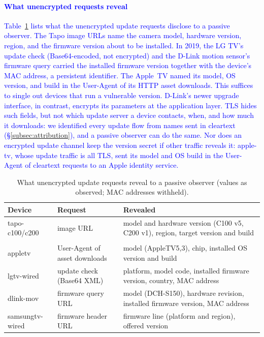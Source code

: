 \paragraph{\textcolor{blue}{What unencrypted requests reveal}}
\textcolor{blue}{Table~\ref{tab:exposure} lists what the unencrypted update requests disclose to a passive observer.
The Tapo image URLs name the camera model, hardware version, region, and the firmware version about to be installed.
In 2019, the LG TV's update check (Base64-encoded, not encrypted) and the D-Link motion sensor's firmware query carried the installed firmware version together with the device's MAC address, a persistent identifier. The Apple~TV named its model, OS version, and build in the User-Agent of its HTTP asset downloads.
This suffices to single out devices that run a vulnerable version.
D-Link's newer upgrade interface, in contrast, encrypts its parameters at the application layer.
TLS hides such fields, but not which update server a device contacts, when, and how much it downloads: we identified every update flow from names sent in cleartext (\S\ref{subsec:attribution}), and a passive observer can do the same.
Nor does an encrypted update channel keep the version secret if other traffic reveals it: apple-tv, whose update traffic is all TLS, sent its model and OS build in the User-Agent of cleartext requests to an Apple identity service.}

\begin{table}[!t]
    \centering
    \color{blue}
    \caption{What unencrypted update requests reveal to a passive observer (values as observed; MAC addresses withheld).}
    \label{tab:exposure}
    \setlength{\tabcolsep}{3pt}
    \footnotesize
    \begin{tabular}{@{} l >{\raggedright\arraybackslash}p{1.55cm} >{\raggedright\arraybackslash}p{4.45cm} @{}}
        \toprule
        \textbf{Device} & \textbf{Request} & \textbf{Revealed} \\
        \midrule
        tapo-c100/c200 & image URL & model and hardware version (C100 v5, C200 v1), region, target version and build \\
        \addlinespace
        \multicolumn{3}{@{}l}{\emph{2019 traces}} \\
        appletv & User-Agent of asset downloads & model (AppleTV5,3), chip, installed OS version and build \\
        lgtv-wired & update check (Base64 XML) & platform, model code, installed firmware version, country, MAC address \\
        dlink-mov & firmware query URL & model (DCH-S150), hardware revision, installed firmware version, MAC address \\
        samsungtv-wired & firmware header URL & firmware line (platform and region), offered version \\
        \bottomrule
    \end{tabular}
\end{table}

